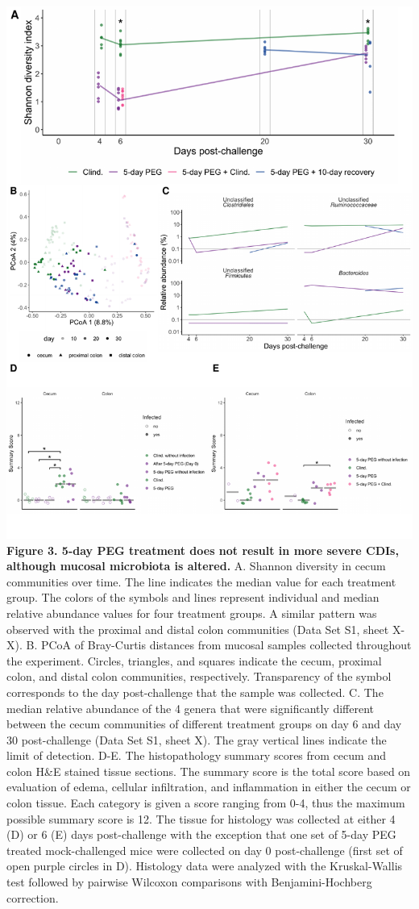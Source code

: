\documentclass[
  11pt,
]{article}
\begin{document}
\includegraphics{figure_3.pdf} \textbf{Figure 3. 5-day PEG treatment
does not result in more severe CDIs, although mucosal microbiota is
altered.} A. Shannon diversity in cecum communities over time. The line
indicates the median value for each treatment group. The colors of the
symbols and lines represent individual and median relative abundance
values for four treatment groups. A similar pattern was observed with
the proximal and distal colon communities (Data Set S1, sheet X-X). B.
PCoA of Bray-Curtis distances from mucosal samples collected throughout
the experiment. Circles, triangles, and squares indicate the cecum,
proximal colon, and distal colon communities, respectively. Transparency
of the symbol corresponds to the day post-challenge that the sample was
collected. C. The median relative abundance of the 4 genera that were
significantly different between the cecum communities of different
treatment groups on day 6 and day 30 post-challenge (Data Set S1, sheet
X). The gray vertical lines indicate the limit of detection. D-E. The
histopathology summary scores from cecum and colon H\&E stained tissue
sections. The summary score is the total score based on evaluation of
edema, cellular infiltration, and inflammation in either the cecum or
colon tissue. Each category is given a score ranging from 0-4, thus the
maximum possible summary score is 12. The tissue for histology was
collected at either 4 (D) or 6 (E) days post-challenge with the
exception that one set of 5-day PEG treated mock-challenged mice were
collected on day 0 post-challenge (first set of open purple circles in
D). Histology data were analyzed with the Kruskal-Wallis test followed
by pairwise Wilcoxon comparisons with Benjamini-Hochberg correction.
\newpage
\end{document}
